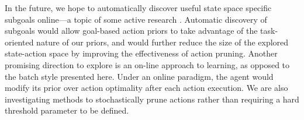 \documentclass[letterpaper]{article}
\begin{document}
In the future, we hope to automatically discover useful state space
specific subgoals online---a topic of some active research
\cite{Mcgovern01automaticdiscovery,Simsek:2005:IUS:1102351.1102454}.
Automatic discovery of subgoals would allow goal-based action priors
to take advantage of the task-oriented nature of our priors, and would
further reduce the size of the explored state-action space by
improving the effectiveness of action pruning. Another promising
direction to explore is an on-line approach to learning, as opposed to the batch style presented here.
Under an online paradigm, the agent would modify its prior over action optimality
after each action execution. We are also investigating methods to stochastically prune
actions rather than requiring a hard threshold parameter to be defined.


{\small


}
\end{document}
